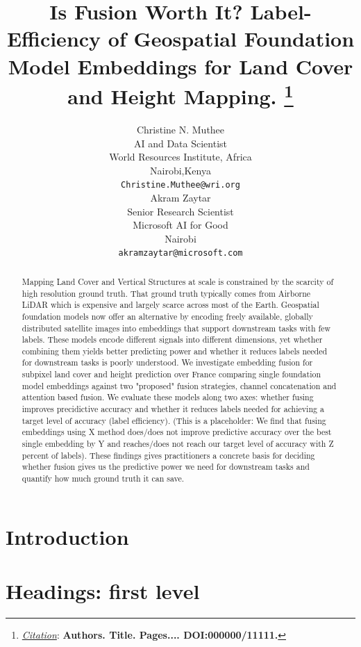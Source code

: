 \documentclass{article}
\title{Is Fusion Worth It? Label-Efficiency of Geospatial Foundation Model Embeddings for Land Cover and Height Mapping.
\thanks{\textit{\underline{Citation}}: 
\textbf{Authors. Title. Pages.... DOI:000000/11111.}} 
}
\author{
  Christine N. Muthee \\
   AI and Data Scientist\\
  World Resources Institute, Africa \\
  Nairobi,Kenya\\
  \texttt{Christine.Muthee@wri.org} \\
   \And
  Akram Zaytar \\
  Senior Research Scientist \\
  Microsoft AI for Good \\
  Nairobi\\
  \texttt{akramzaytar@microsoft.com} \\
}
\begin{document}
\maketitle


\begin{abstract}
Mapping Land Cover and Vertical Structures at scale is constrained by the scarcity of high resolution ground truth. That ground truth typically comes from Airborne LiDAR which is expensive and largely scarce across most of the Earth.
Geospatial foundation models now offer an alternative by encoding freely available, globally distributed satellite images into embeddings that support downstream tasks with few labels.
These models encode different signals into different dimensions, yet whether combining them yields better predicting power and whether it reduces labels needed for downstream tasks is poorly understood.
We investigate embedding fusion for subpixel land cover and height prediction over France comparing single foundation model embeddings against two "proposed" fusion strategies, channel concatenation and attention based fusion. 
We evaluate these models along two axes: whether fusing improves precidictive accuracy and whether it reduces labels needed for achieving a target level of accuracy (label efficiency).
(This is a placeholder: We find that fusing embeddings using X method does/does not improve predictive accuracy over the best single embedding by Y and reaches/does not reach our target level of accuracy with Z percent of labels). 
These findings gives practitioners a concrete basis for deciding whether fusion gives us the predictive power we need for downstream tasks and quantify how much ground truth it can save. 

\end{abstract}




\section{Introduction}
\lipsum[2]
\lipsum[3]


\section{Headings: first level}
\label{sec:headings}
\end{document}
